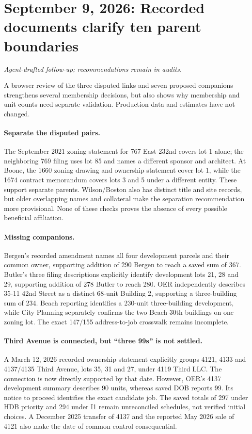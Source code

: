 \clearpage
\section*{September 9, 2026: Recorded documents clarify ten parent boundaries}
\textit{Agent-drafted follow-up; recommendations remain in audits.}

A browser review of the three disputed links and seven proposed companions strengthens several membership decisions, but also shows why membership and unit counts need separate validation. Production data and estimates have not changed.

\paragraph{Separate the disputed pairs.} The September 2021 zoning statement for 767 East 232nd covers lot 1 alone; the neighboring 769 filing uses lot 85 and names a different sponsor and architect. At Boone, the 1660 zoning drawing and ownership statement cover lot 1, while the 1674 contract memorandum covers lots 3 and 5 under a different entity. These support separate parents. Wilson/Boston also has distinct title and site records, but older overlapping names and collateral make the separation recommendation more provisional. None of these checks proves the absence of every possible beneficial affiliation.

\paragraph{Missing companions.} Bergen's recorded amendment names all four development parcels and their common owner, supporting addition of 290 Bergen to reach a saved sum of 367. Butler's three filing descriptions explicitly identify development lots 21, 28 and 29, supporting addition of 278 Butler to reach 280. OER independently describes 35-11 42nd Street as a distinct 68-unit Building 2, supporting a three-building sum of 234. Beach reporting identifies a 230-unit three-building development, while City Planning separately confirms the two Beach 30th buildings on one zoning lot. The exact 147/155 address-to-job crosswalk remains incomplete.

\paragraph{Third Avenue is connected, but ``three 99s'' is not settled.} A March 12, 2026 recorded ownership statement explicitly groups 4121, 4133 and 4137/4135 Third Avenue, lots 35, 31 and 27, under 4119 Third LLC. The connection is now directly supported by that date. However, OER's 4137 development summary describes 90 units, whereas saved DOB reports 99. Its notice to proceed identifies the exact candidate job. The saved totals of 297 under HDB priority and 294 under I1 remain unreconciled schedules, not verified initial choices. A December 2025 transfer of 4137 and the reported May 2026 sale of 4121 also make the date of common control consequential.

